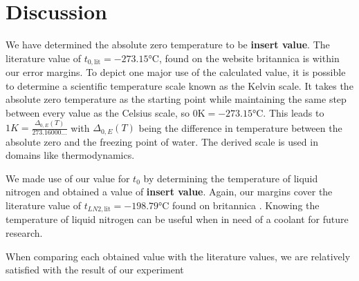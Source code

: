 \section{Discussion}
    We have determined the absolute zero temperature to be \textbf{insert value}.
    The literature value of $t_{0, \text{lit}} = -273.15 \si{\celsius}$, found on the website britannica \cite{literature_absolute_zero} is within our error margins.
    To depict one major use of the calculated value, it is possible to determine a scientific temperature scale known as the Kelvin scale.
    It takes the absolute zero temperature as the starting point while maintaining the same step between every value as the Celsius scale, so $0 \si{\kelvin} = -273.15 \si{\celsius}$.
    This leads to $1K = \frac{\Delta_{0, E}(T)}{273.16000...}$ with $\Delta_{0, E}(T)$ being the difference in temperature between the absolute zero and the freezing point of water.
    The derived scale is used in domains like thermodynamics.

    We made use of our value for $t_0$ by determining the temperature of liquid nitrogen and obtained a value of \textbf{insert value}.
    Again, our margins cover the literature value of $t_{LN2, \text{lit}} = -198.79 \si{\celsius}$ found on britannica \cite{literature_liquid_nitrogen}.
    Knowing the temperature of liquid nitrogen can be useful when in need of a coolant for future research.

    When comparing each obtained value with the literature values, we are relatively satisfied with the result of our experiment



    
    
   